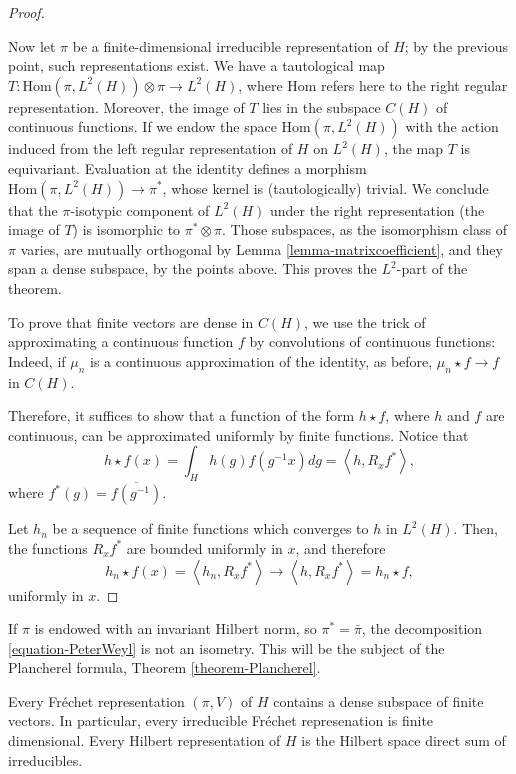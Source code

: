 \begin{proof}
\begin{itemize}
\end{itemize}

Now let $\pi$ be a finite-dimensional irreducible representation of $H$; by the previous point, such representations exist. We have a tautological map $T:\text{Hom}(\pi, L^2(H)) \otimes \pi\to L^2(H)$, where $\text{Hom}$ refers here to the right regular representation. Moreover, the image of $T$ lies in the subspace $C(H)$ of continuous functions. If we endow the space $\text{Hom}(\pi, L^2(H))$ with the action induced from the left regular representation of $H$ on $L^2(H)$, the map $T$ is equivariant. Evaluation at the identity defines a morphism $\text{Hom}(\pi, L^2(H)) \to \pi^*$, whose kernel is (tautologically) trivial. We conclude that the $\pi$-isotypic component of $L^2(H)$ under the right representation (the image of $T$) is isomorphic to $\pi^*\otimes \pi$. Those subspaces, as the isomorphism class of $\pi$ varies, are mutually orthogonal by Lemma \ref{lemma-matrixcoefficient}, and they span a dense subspace, by the points above. This proves the $L^2$-part of the theorem.

To prove that finite vectors are dense in $C(H)$, we use the trick of approximating a continuous function $f$ by convolutions of continuous functions: Indeed, if $\mu_n$ is a continuous approximation of the identity, as before, $\mu_n \star f \to f$ in $C(H)$. 

Therefore, it suffices to show that a function of the form $h\star f$, where $h$ and $f$ are continuous, can be approximated uniformly by finite functions. Notice that 
$$h\star f(x) = \int_H h(g) f(g^{-1}x) dg = \left< h, R_x f^*\right>,$$ where $f^*(g) = \overline{f(g^{-1})}$.

Let $h_n$ be a sequence of finite functions which converges to $h$ in $L^2(H)$. Then, the functions $R_x f^*$ are bounded uniformly in $x$, and therefore
$$ h_n\star f(x) = \left< h_n, R_x f^*\right> \to \left< h, R_x f^*\right> = h_n\star f,$$
uniformly in $x$.

\end{proof}


\begin{remark}
 If $\pi$ is endowed with an invariant Hilbert norm, so $\pi^*= \bar\pi$, the decomposition \eqref{equation-PeterWeyl} is not an isometry. This will be the subject of the Plancherel formula, Theorem \ref{theorem-Plancherel}.
\end{remark}


\begin{theorem}
\label{theorem-PeterWeyl-general}
 Every Fr\'echet representation $(\pi,V)$ of $H$ contains a dense subspace of finite vectors. In particular, every irreducible Fr\'echet represenation is finite dimensional. Every Hilbert representation of $H$ is the Hilbert space direct sum of irreducibles.
\end{theorem}


